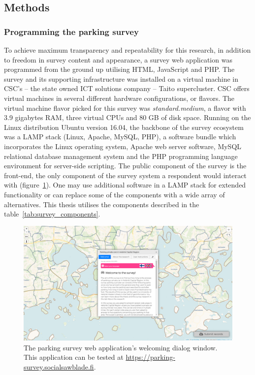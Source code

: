 \subsection{Methods}
\subsubsection{Programming the parking survey}
\justify

To achieve maximum transparency and repeatability for this research, in addition to freedom in survey content and appearance, a survey web application was programmed from the ground up utilising HTML, JavaScript and PHP. The survey and its supporting infrastructure was installed on a virtual machine in CSC's -- the state owned ICT solutions company -- Taito supercluster. CSC offers virtual machines in several different hardware configurations, or flavors. The virtual machine flavor picked for this survey was \textit{standard.medium}, a flavor with 3.9 gigabytes RAM, three virtual CPUs and 80 GB of disk space. Running on the Linux distribution Ubuntu version 16.04, the backbone of the survey ecosystem was a LAMP stack (Linux, Apache, MySQL, PHP), a software bundle which incorporates the Linux operating system, Apache web server software, MySQL relational database management system and the PHP programming language environment for server-side scripting. The public component of the survey is the front-end, the only component of the survey system a respondent would interact with (figure~\ref{fig:js_survey_welcome}). One may use additional software in a LAMP stack for extended functionality or can replace some of the components with a wide array of alternatives. This thesis utilises the components described in the table~\ref{tab:survey_components}.

\begin{figure}[H]%
    \includegraphics[width=\textwidth]{images/js_survey_welcome.png}
    \caption[Survey application landing page]{The parking survey web application's welcoming dialog window. This application can be tested at \textcolor{blue}{\url{https://parking-survey.socialsawblade.fi}}.}%
    \label{fig:js_survey_welcome}%
\end{figure}

